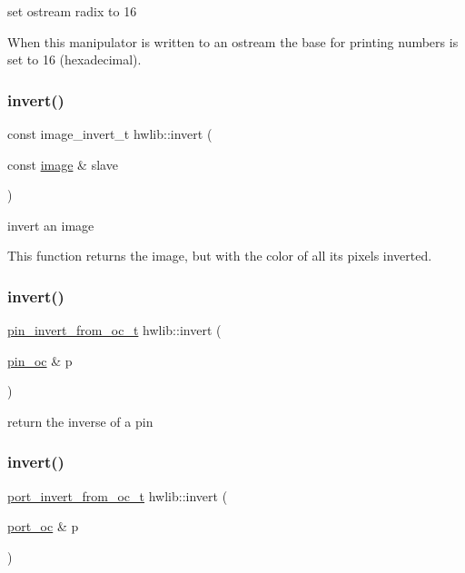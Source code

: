 set ostream radix to 16

When this manipulator is written to an ostream the base for printing numbers is set to 16 (hexadecimal). \mbox{\label{namespacehwlib_ab619d7f70bb62112b2a04192f5103a24}} 
\subsubsection{\texorpdfstring{invert()}{invert()}\hspace{0.1cm}{\footnotesize\ttfamily [1/3]}}
{\footnotesize\ttfamily const image\+\_\+invert\+\_\+t hwlib\+::invert (\begin{DoxyParamCaption}\item[{const \hyperlink{classhwlib_1_1image}{image} \&}]{slave }\end{DoxyParamCaption})}

invert an image

This function returns the image, but with the color of all its pixels inverted. \mbox{\label{namespacehwlib_ae3ff35b5dc535898b776d2a42131d0b6}} 
\subsubsection{\texorpdfstring{invert()}{invert()}\hspace{0.1cm}{\footnotesize\ttfamily [2/3]}}
{\footnotesize\ttfamily \hyperlink{classhwlib_1_1pin__invert__from__oc__t}{pin\+\_\+invert\+\_\+from\+\_\+oc\+\_\+t} hwlib\+::invert (\begin{DoxyParamCaption}\item[{\hyperlink{classhwlib_1_1pin__oc}{pin\+\_\+oc} \&}]{p }\end{DoxyParamCaption})}

return the inverse of a pin \mbox{\label{namespacehwlib_a5c1e15f25a48422bbb39fa1aba2c27e9}} 
\subsubsection{\texorpdfstring{invert()}{invert()}\hspace{0.1cm}{\footnotesize\ttfamily [3/3]}}
{\footnotesize\ttfamily \hyperlink{classhwlib_1_1port__invert__from__oc__t}{port\+\_\+invert\+\_\+from\+\_\+oc\+\_\+t} hwlib\+::invert (\begin{DoxyParamCaption}\item[{\hyperlink{classhwlib_1_1port__oc}{port\+\_\+oc} \&}]{p }\end{DoxyParamCaption})}

